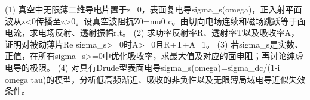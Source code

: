 (1) 真空中无限薄二维导电片置于z=0，表面复电导sigma_s(omega)，正入射平面波从z<0传播至z>0。设真空波阻抗Z0=mu0 c。由切向电场连续和磁场跳跃等于面电流，求电场反射、透射振幅r,t。
(2) 求功率反射率R、透射率T以及吸收率A，证明对被动薄片Re sigma_s>=0时A>=0且R+T+A=1。
(3) 若sigma_s是实数、正值，在所有sigma_s>=0中优化吸收率，求最大值及对应的面电阻；再讨论纯虚电导的极限。
(4) 对具有Drude型表面电导sigma_s(omega)=sigma_dc/(1-i omega tau)的模型，分析低高频渐近、吸收的非负性以及无限薄局域电导近似失效条件。
